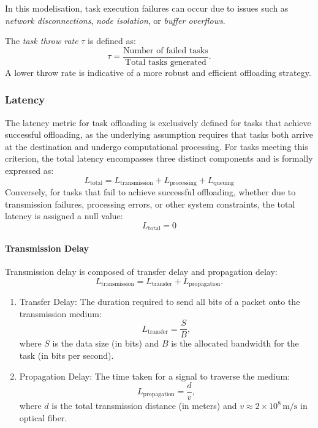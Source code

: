 \documentclass{svproc}
\begin{document}
In this modelisation, task execution failures can occur due to issues such as \emph{network disconnections}, \emph{node isolation}, or \emph{buffer overflows}.

The \emph{task throw rate} \(\tau\) is defined as:
\begin{equation}
\tau = \frac{\text{Number of failed tasks}}{\text{Total tasks generated}}.
\end{equation}
A lower throw rate is indicative of a more robust and efficient offloading strategy.

\subsubsection{Latency}\label{subsubsec:latency}

The latency metric for task offloading is exclusively defined for tasks that achieve successful offloading, as the underlying assumption requires that tasks both arrive at the destination and undergo computational processing. For tasks meeting this criterion, the total latency encompasses three distinct components and is formally expressed as:
\begin{equation}
L_{\text{total}} = L_{\text{transmission}} + L_{\text{processing}} + L_{\text{queuing}}
\end{equation}
Conversely, for tasks that fail to achieve successful offloading, whether due to transmission failures, processing errors, or other system constraints, the total latency is assigned a null value:
\begin{equation}
L_{\text{total}} = 0
\end{equation}

\paragraph{Transmission Delay}
Transmission delay is composed of transfer delay and propagation delay:
\begin{equation}
L_{\text{transmission}} = L_{\text{transfer}} + L_{\text{propagation}}.
\end{equation}

\begin{enumerate}
    \item Transfer Delay: The duration required to send all bits of a packet onto the transmission medium:
    \begin{equation}
    L_{\text{transfer}} = \frac{S}{B},
    \end{equation}
    where \( S \) is the data size (in bits) and \( B \) is the allocated bandwidth for the task (in bits per second).

    \item Propagation Delay: The time taken for a signal to traverse the medium:
    \begin{equation}
    L_{\text{propagation}} = \frac{d}{v},
    \end{equation}
    where \( d \) is the total transmission distance (in meters) and \( v \approx 2 \times 10^8 \,\text{m/s}\) in optical fiber.
\end{enumerate}
\end{document}
